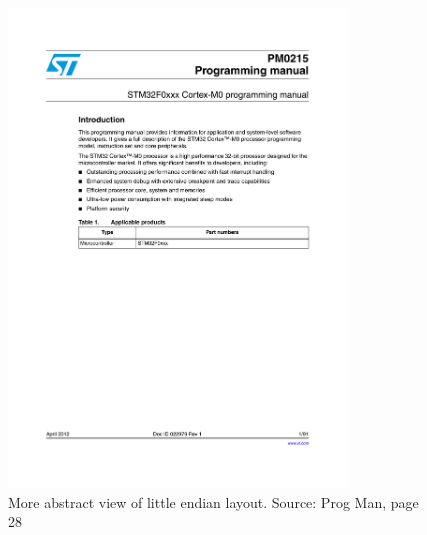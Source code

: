 \begin{figure}
  \centering
  \includegraphics[width=0.8\textwidth, page=21, clip=true, trim=160px 285px 160px 427px]{./stm32f0xx_programming_manual.pdf} %
  \caption{More abstract view of little endian layout. Source: Prog Man, page 28}
  \label{fig:little_end_prog_man}
\end{figure}


